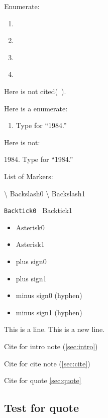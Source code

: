 Enumerate:

\begin{enumerate}
\item  \citet{Kormendy&Ho2013ARA&A, Koss2012ApJ}

\item  \citet{Kormendy&Ho2013ARA&A, Koss2012ApJ}

\item  \citet[foo]{Kormendy&Ho2013ARA&A, Koss2012ApJ}

\item  \citet[foo][bar]{Kormendy&Ho2013ARA&A, Koss2012ApJ}

\end{enumerate}

Here is not cited(~\nocite{Povic2012A&A}).

Here is a enumerate:

\begin{enumerate}
\item Type for ``1984.''

\end{enumerate}

Here is not:

1984. Type for ``1984.''

List of Markers:

\textbackslash{} Backslash0
\textbackslash{} Backslash1

\texttt{Backtick0
} Backtick1

\begin{itemize}
\item Asterisk0

\item Asterisk1

\item plus sign0

\item plus sign1

\item minus sign0 (hyphen)

\item minus sign1 (hyphen)

\end{itemize}

This is a line.
This is a new line.

Cite for intro note (\autoref{sec:intro})

Cite for cite note (\autoref{sec:cite})

Cite for quote \autoref{sec:quote}

\subsection{Test for quote}
\label{sec:quote}

